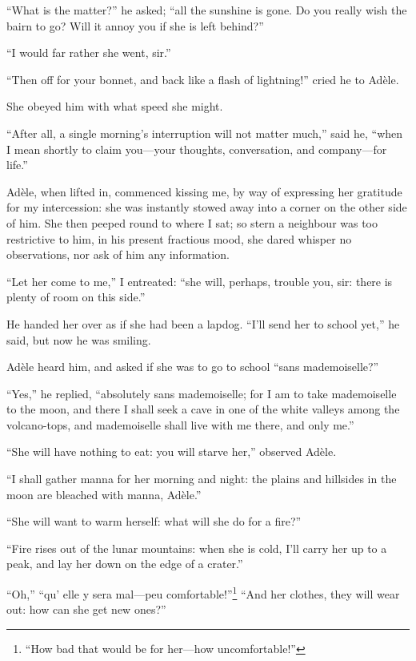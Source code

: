 \enquote{What is the matter?} he asked; \enquote{all the sunshine is
	gone.  Do you really wish the bairn to go?  Will it annoy you if she is
	left behind?}

\enquote{I would far rather she went, sir.}

\enquote{Then off for your bonnet, and back like a flash of lightning!}
cried he to Adèle.

She obeyed him with what speed she might.

\enquote{After all, a single morning's interruption will not matter
	much,} said he, \enquote{when I mean shortly to claim you---your
	thoughts, conversation, and company---for life.}

Adèle, when lifted in, commenced kissing me, by way of expressing her
gratitude for my intercession: she was instantly stowed away into a
corner on the other side of him.  She then peeped round to where I sat;
so stern a neighbour was too restrictive to him, in his present
fractious mood, she dared whisper no observations, nor ask of him any
information.

\enquote{Let her come to me,} I entreated: \enquote{she will, perhaps,
	trouble you, sir: there is plenty of room on this side.}

He handed her over as if she had been a lapdog.  \enquote{I'll send her
	to school yet,} he said, but now he was smiling.

Adèle heard him, and asked if she was to go to school \enquote{sans
	mademoiselle?}

\enquote{Yes,} he replied, \enquote{absolutely sans mademoiselle; for I
	am to take mademoiselle to the moon, and there I shall seek a cave in
	one of the white valleys among the volcano-tops, and mademoiselle shall
	live with me there, and only me.}

\enquote{She will have nothing to eat: you will starve her,} observed
Adèle.

\enquote{I shall gather manna for her morning and night: the plains and
	hillsides in the moon are bleached with manna, Adèle.}

\enquote{She will want to warm herself: what will she do for a fire?}

\enquote{Fire rises out of the lunar mountains: when she is cold, I'll
	carry her up to a peak, and lay her down on the edge of a crater.}

\enquote{Oh,} \foreignquote{french}{qu' elle y sera mal---peu comfortable!}\footnote{
	\enquote{How bad that would be for her---how uncomfortable!}}
\enquote{And her clothes, they will wear out: how can she get new ones?}


